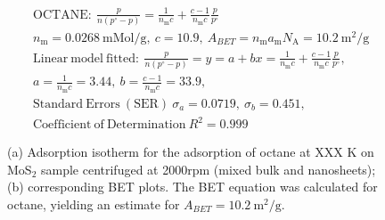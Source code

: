

\begin{align*}
&\mathrm{OCTANE:}\ \frac{p}{n(p^\circ-p)}=\frac{1}{n_\mathrm{m}c}+\frac{c-1}{n_\mathrm{m}c}\frac{p}{p^\circ}\\
&{n_\mathrm{m}}=0.0268\ \mathrm{mMol/g},\ c=10.9,\ A_{BET}={n_\mathrm{m}}{a_\mathrm{m}}{N_\mathrm{A}}=10.2\ \mathrm{m}^2\mathrm{/g}\\
&\mathrm{Linear\ model\ fitted:}\ \frac{p}{n(p^\circ-p)}=y=a+bx=\frac{1}{n_\mathrm{m}c}+\frac{c-1}{n_\mathrm{m}c}\frac{p}{p^\circ},\\
&a=\frac{1}{n_\mathrm{m}c}=3.44,\ b=\frac{c-1}{n_\mathrm{m}c}=33.9,\\
&\mathrm{Standard\ Errors\ (SER)}\ \sigma_a=0.0719,\ \sigma_b=0.451,\\
&\mathrm{Coefficient\ of\ Determination}\ R^2 = 0.999
\end{align*}


\begin{figure}[htb]
\hfill
{}
\caption{(a) Adsorption isotherm for the adsorption of octane at XXX K on MoS$_2$ 
sample centrifuged at 2000rpm (mixed bulk and nanosheets);
(b) corresponding BET plots. The BET equation was calculated for octane, yielding an estimate for $A_{BET}=10.2\ \mathrm{m}^2\mathrm{/g}$.}

\label{fig:sa-Reference-As-Supplied-13mg-2mm-30C-S3-SA-10ml}
\end{figure}


